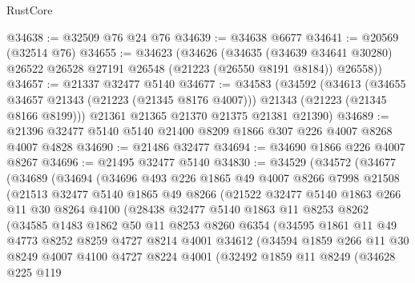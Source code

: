 \begin{lexlean}{RustCore}
\begin{coremodule}
@34638 := @32509 @76 @24 @76
@34639 := @34638 @6677
@34641 := @20569 (@32514 @76)
@34655 := @34623
    (@34626
      (@34635
        (@34639 @34641 @30280)
        @26522
        @26528
        @27191
        @26548
        (@21223 (@26550 @8191 @8184))
        @26558))
@34657 := @21337 @32477 @5140
@34677 := @34583
    (@34592
      (@34613
        (@34655 @34657 @21343 (@21223 (@21345 @8176 @4007)))
        @21343
        (@21223 (@21345 @8166 @8199)))
      @21361
      @21365
      @21370
      @21375
      @21381
      @21390)
@34689 := @21396 @32477 @5140 @5140 @21400 @8209 @1866 @307 @226 @4007 @8268 @4007 @4828
@34690 := @21486 @32477
@34694 := @34690 @1866 @226 @4007 @8267
@34696 := @21495 @32477 @5140
@34830 := @34529
    (@34572
      (@34677
        (@34689
          (@34694
            (@34696
              @493
              @226
              @1865
              @49
              @4007
              @8266
              @7998
              @21508
              (@21513
                @32477
                @5140
                @1865
                @49
                @8266
                (@21522
                  @32477
                  @5140
                  @1863
                  @266
                  @11
                  @30
                  @8264
                  @4100
                  (@28438
                    @32477
                    @5140
                    @1863
                    @11
                    @8253
                    @8262
                    (@34585
                      @1483
                      @1862
                      @50
                      @11
                      @8253
                      @8260
                      @6354
                      (@34595
                        @1861
                        @11
                        @49
                        @4773
                        @8252
                        @8259
                        @4727
                        @8214
                        @4001
                        @34612
                        (@34594
                          @1859
                          @266
                          @11
                          @30
                          @8249
                          @4007
                          @4100
                          @4727
                          @8224
                          @4001
                          (@32492
                            @1859
                            @11
                            @8249
                            (@34628
                              @225
                              @119

\end{coremodule}
\end{lexlean}

